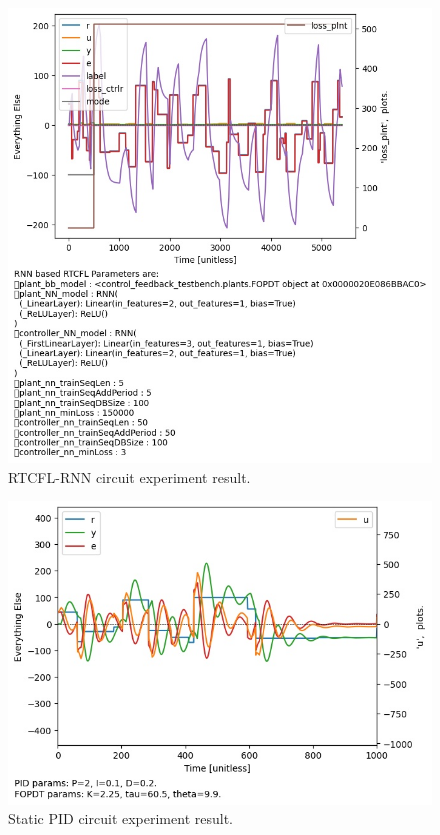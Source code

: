\documentclass[10pt,twocolumn,letterpaper]{article}
\begin{document}
            \begin{figure}[h]
                \includegraphics[width=\linewidth]{figures/output_plot_2022May03175716.jpg}
                \centering
                \caption{RTCFL-RNN circuit experiment result.}
                \label{rnnOut}
            \end{figure}
            \begin{figure}[h]
                \includegraphics[width=\linewidth]{figures/output_plot_2022May04154543.jpg}
                \centering
                \caption{Static PID circuit experiment result.}
                \label{pidOut}
            \end{figure}
\end{document}
